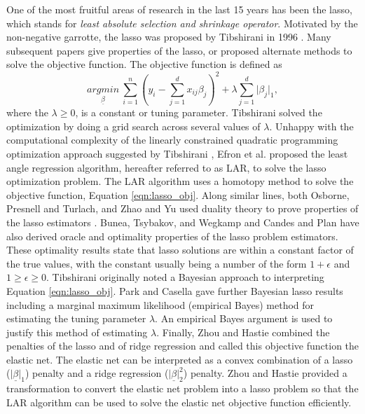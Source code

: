 One of the most fruitful areas of research in the last 15 years has been the lasso, which stands for \emph{least absolute selection and shrinkage operator}. Motivated by the non-negative garrotte, the lasso was proposed by Tibshirani in 1996 \cite{tibshirani1996regression}. Many subsequent papers give properties of the lasso, or proposed alternate methods to solve the objective function. The objective function is defined as
\begin{equation}\label{eqn:lasso_obj}
\underset{\underline{\beta}}{argmin}\ \sum_{i=1}^n(y_i - \sum_{j=1}^dx_{ij}\beta_j)^2 +\lambda\sum_{j=1}^d\vert \beta_j\vert_1,
\end{equation}
 where the $\lambda \geq 0$, is a constant or tuning parameter. Tibshirani solved the optimization by doing a grid search across several values of $\lambda$. Unhappy with the computational complexity of the linearly constrained quadratic programming optimization approach suggested by Tibshirani \cite{tibshirani1996regression}, Efron et al. \cite{efron2004least} proposed the least angle regression algorithm, hereafter referred to as LAR, to solve the lasso optimization problem. The LAR algorithm uses a homotopy method to solve the objective function, Equation \ref{eqn:lasso_obj}. Along similar lines, both Osborne, Presnell and Turlach, and Zhao and Yu used duality theory to prove properties of the lasso estimators \cite{osborne2000lasso,zhao2007model}. Bunea, Tsybakov, and Wegkamp  \cite{bunea2007sparsity} and Candes and Plan  \cite{candes2011tight} have also derived oracle and optimality properties of the lasso problem estimators. These optimality results state that lasso solutions are within a constant factor of the true values, with the constant usually being a number of the form $1+\epsilon$ and $1\geq\epsilon\geq 0$. Tibshirani \cite{tibshirani1996regression} originally noted a Bayesian approach to interpreting Equation \ref{eqn:lasso_obj}. Park and Casella  \cite{park2008bayesian} gave further Bayesian lasso results including a marginal maximum likelihood (empirical Bayes) method for estimating the tuning parameter $\lambda$. An empirical Bayes argument is used to justify this method of estimating $\lambda$. Finally, Zhou and Hastie \cite{zou2005regularization} combined the penalties of the lasso and of ridge regression and called this objective function the elastic net. The elastic net can be interpreted as a convex combination of a lasso ($\vert \underline{\beta}\vert_1$) penalty and a ridge regression ($\vert \underline{\beta}\vert_2^2$) penalty. Zhou and Hastie \cite{zou2005regularization} provided a transformation to convert the elastic net problem into a lasso problem so that the LAR algorithm can be used to solve the elastic net objective function efficiently.      
 
